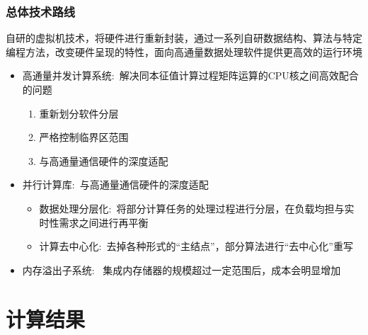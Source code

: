 \begin{frame}
	\frametitle{总体技术路线}
	自研的虚拟机技术，将硬件进行重新封装，通过一系列自研数据结构、算法与特定编程方法，改变硬件呈现的特性，面向高通量数据处理软件提供更高效的运行环境
	\begin{itemize}
		\item 高通量并发计算系统:~解决同本征值计算过程矩阵运算的\textrm{CPU}核之间高效配合的问题
			\begin{enumerate}
\fontsize{7.2pt}{5.2pt}\selectfont
				\item 重新划分软件分层
				\item 严格控制临界区范围
				\item 与高通量通信硬件的深度适配
			\end{enumerate}
		\item 并行计算库:~与高通量通信硬件的深度适配
			\begin{itemize}
\fontsize{7.2pt}{5.2pt}\selectfont
				\item 数据处理分层化:~将部分计算任务的处理过程进行分层，在负载均担与实时性需求之间进行再平衡
				\item 计算去中心化:~去掉各种形式的``主结点''，部分算法进行``去中心化''重写
			\end{itemize}
		\item 内存溢出子系统:~%
			集成内存储器的规模超过一定范围后，成本会明显增加\\
			{\fontsize{7.2pt}{5.2pt}}
	\end{itemize}
\end{frame}

\section{计算结果}

